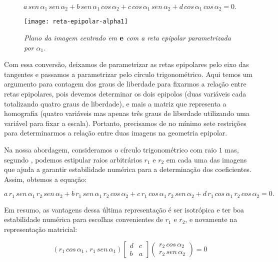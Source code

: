\begin{equation*}
a\,sen\,\alpha_1\,sen\,\alpha_2+b\,sen\,\alpha_1\,cos\,\alpha_2+c\,cos\,\alpha_1\,sen\,\alpha_2+d\,cos\,\alpha_1\,cos\,\alpha_2=0.
\end{equation*}

\begin{figure}[!htb]
\centering
\texttt{[image: reta-epipolar-alpha1]}
\caption{\textit{Plano da imagem centrado em ${\bf e}$ com a reta epipolar parametrizada por $\alpha_1$.}}
\label{fig.reta-epipolar}
\end{figure}
Com essa conversão, deixamos de parametrizar as retas epipolares pelo eixo das tangentes e passamos a parametrizar pelo círculo trigonométrico. Aqui temos um argumento para contagem dos graus de liberdade para fixarmos a relação entre retas epipolares, pois devemos determinar os dois epipolos (duas variáveis cada totalizando quatro graus de liberdade), e mais a matriz que representa a homografia (quatro variáveis mas apenas três graus de liberdade utilizando uma variável para fixar a escala). Portanto, precisamos de no mínimo sete restrições para determinarmos a relação entre duas imagens na geometria epipolar. 

Na nossa abordagem, consideramos o círculo trigonométrico com raio $1$ mas, segundo \cite{Fabbri:Kimia:CVPR10}, podemos estipular raios arbitrários $r_1$ e $r_2$ em cada uma das imagens que ajuda a garantir estabilidade numérica para a determinação dos coeficientes. Assim, obtemos a equação:

\begin{equation*}
a\,r_1\,sen\,\alpha_1\,r_2\,sen\,\alpha_2+b\,r_1\,sen\,\alpha_1\,r_2\,cos\,\alpha_2+c\,r_1\,cos\,\alpha_1\,r_2\,sen\,\alpha_2+d\,r_1\,cos\,\alpha_1\,r_2\,cos\,\alpha_2=0.
\end{equation*}

Em resumo, as vantagens dessa última representação é ser isotrópica e ter boa estabilidade numérica para escolhas convenientes de $r_1$ e $r_2$, e novamente  na representação matricial:

\begin{equation*}
(r_1\,cos\,\alpha_1\,,\,r_1\,sen\,\alpha_1)
\begin{bmatrix}
d&c\\
b&a
\end{bmatrix}
\begin{pmatrix}
r_2\,cos\,\alpha_2\\
r_2\,sen\,\alpha_2
\end{pmatrix}
=0
\end{equation*}


